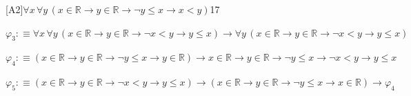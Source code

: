 \begin{fullproof}{[A2]}{$\forall x\,\forall y\,(x \in \mathbb{R} \to y \in \mathbb{R} \to \neg y \leq x \to x < y)$}{17}
\begin{abbrevlist}
\item $\varphi_{3} :\equiv \forall x\,\forall y\,(x \in \mathbb{R} \to y \in \mathbb{R} \to \neg x < y \to y \leq x) \to \forall y\,(x \in \mathbb{R} \to y \in \mathbb{R} \to \neg x < y \to y \leq x)$
\item $\varphi_{4} :\equiv (x \in \mathbb{R} \to y \in \mathbb{R} \to \neg y \leq x \to y \in \mathbb{R}) \to x \in \mathbb{R} \to y \in \mathbb{R} \to \neg y \leq x \to \neg x < y \to y \leq x$
\item $\varphi_{5} :\equiv (x \in \mathbb{R} \to y \in \mathbb{R} \to \neg x < y \to y \leq x) \to (x \in \mathbb{R} \to y \in \mathbb{R} \to \neg y \leq x \to x \in \mathbb{R}) \to \varphi_{4}$
\end{abbrevlist}
\end{fullproof}

